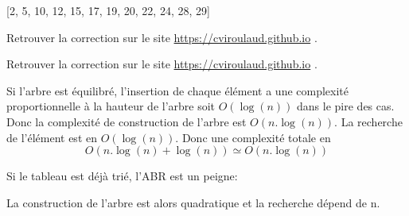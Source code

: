 \documentclass[a4paper,11pt]{article}
\begin{document}
\begin{exo}
    \begin{center}
        \label{arbre}
    \end{center}
    
    [2, 5, 10, 12, 15, 17, 19, 20, 22, 24, 28, 29]
\end{exo}
\begin{exo} Retrouver la correction sur le site \url{https://cviroulaud.github.io} .
\end{exo}
\begin{exo} Retrouver la correction sur le site \url{https://cviroulaud.github.io} .

    Si l'arbre est équilibré, l'insertion de chaque élément a une complexité proportionnelle à la hauteur de l'arbre soit $O(\log(n))$ dans le pire des cas. Donc la complexité de construction de l'arbre est $O(n.\log(n))$. La recherche de l'élément est en $O(\log(n))$. Donc une complexité totale en $$O(n.\log(n) + \log(n))\simeq O(n.\log(n))$$

    Si le tableau est déjà trié, l'ABR est un peigne:
    \begin{center}
    \end{center}
    La construction de l'arbre est alors quadratique et la recherche dépend de n.
\end{exo}
\end{document}
